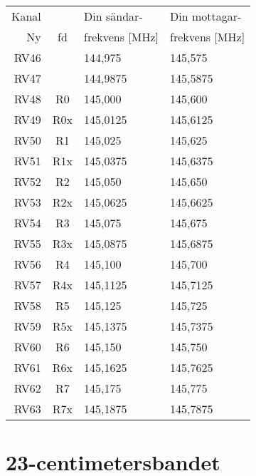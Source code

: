 \begin{tabular}{ r | c | l | l }
	Kanal & & Din sändar- & Din mottagar- \\
	Ny    & fd & frekvens [\si{\mega\hertz}] & frekvens [\si{\mega\hertz}] \\
	\hline
	RV46 & & 144,975 & 145,575\\
	RV47 & & 144,9875 & 145,5875\\
	RV48 & R0 & 145,000 & 145,600 \\
	RV49 & R0x & 145,0125 & 145,6125 \\
	RV50 & R1 & 145,025 & 145,625 \\
	RV51 & R1x & 145,0375 & 145,6375 \\
	RV52 & R2 & 145,050 & 145,650 \\
	RV53 & R2x & 145,0625 & 145,6625 \\
	RV54 & R3 & 145,075 & 145,675 \\
	RV55 & R3x & 145,0875 & 145,6875 \\
	RV56 & R4 & 145,100 & 145,700 \\
	RV57 & R4x & 145,1125 & 145,7125 \\
	RV58 & R5 & 145,125 & 145,725 \\
	RV59 & R5x & 145,1375 & 145,7375 \\
	RV60 & R6 & 145,150 & 145,750 \\
	RV61 & R6x & 145,1625 & 145,7625 \\
	RV62 & R7 & 145,175 & 145,775 \\
	RV63 & R7x & 145,1875 & 145,7875 \\
\end{tabular}

\section{23-centimetersbandet}

